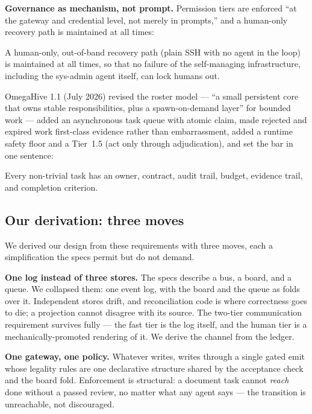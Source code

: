 \textbf{Governance as mechanism, not prompt.} Permission tiers are enforced ``at the gateway and credential level, not merely in prompts,'' and a human-only recovery path is maintained at all times:

\begin{benquote}
A human-only, out-of-band recovery path (plain SSH with no agent in the loop) is maintained at all times, so that no failure of the self-managing infrastructure, including the sys-admin agent itself, can lock humans out.
\end{benquote}

OmegaHive 1.1 (July 2026) revised the roster model --- ``a small persistent core that owns stable responsibilities, plus a spawn-on-demand layer'' for bounded work --- added an asynchronous task queue with atomic claim, made rejected and expired work first-class evidence rather than embarrassment, added a runtime safety floor and a Tier~1.5 (act only through adjudication), and set the bar in one sentence:

\begin{benquote}
Every non-trivial task has an owner, contract, audit trail, budget, evidence trail, and completion criterion.
\end{benquote}

\subsection{Our derivation: three moves}

We derived our design from these requirements with three moves, each a simplification the specs permit but do not demand.

\textbf{One log instead of three stores.} The specs describe a bus, a board, and a queue. We collapsed them: one event log, with the board and the queue as folds over it. Independent stores drift, and reconciliation code is where correctness goes to die; a projection cannot disagree with its source. The two-tier communication requirement survives fully --- the fast tier is the log itself, and the human tier is a mechanically-promoted rendering of it. We derive the channel from the ledger.

\textbf{One gateway, one policy.} Whatever writes, writes through a single gated emit whose legality rules are one declarative structure shared by the acceptance check and the board fold. Enforcement is structural: a document task cannot \emph{reach} done without a passed review, no matter what any agent says --- the transition is unreachable, not discouraged.

